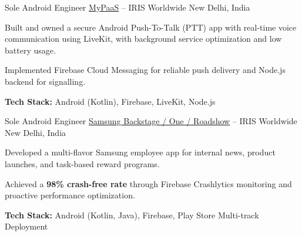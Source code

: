 

\begin{cventries}

  \cventry
    {Sole Android Engineer} %
    {\href{https://play.google.com/store/apps/details?id=com.namamiglobal.mypass&hl=en}{MyPaaS} -- IRIS Worldwide} %
    {New Delhi, India} %
    {} %
    {
      \begin{cvitems}
        \item {Built and owned a secure Android Push-To-Talk (PTT) app with real-time voice communication using LiveKit, with background service optimization and low battery usage.}
        \item {Implemented Firebase Cloud Messaging for reliable push delivery and Node.js backend for signalling.}
        \item {\textbf{Tech Stack:} Android (Kotlin), Firebase, LiveKit, Node.js}
      \end{cvitems}
    }
\vspace{0.1cm}

  \cventry
    {Sole Android Engineer} %
    {\href{https://play.google.com/store/apps/details?id=com.samsung.uk.backstage}{Samsung Backstage / One / Roadshow} -- IRIS Worldwide} %
    {New Delhi, India} %
    {} %
    {
      \begin{cvitems}
        \item {Developed a multi-flavor Samsung employee app for internal news, product launches, and task-based reward programs.}
        \item {Achieved a \textbf{98\% crash-free rate} through Firebase Crashlytics monitoring and proactive performance optimization.}
        \item {\textbf{Tech Stack:} Android (Kotlin, Java), Firebase, Play Store Multi-track Deployment}
      \end{cvitems}
    }
\vspace{0.1cm}


\end{cventries}
